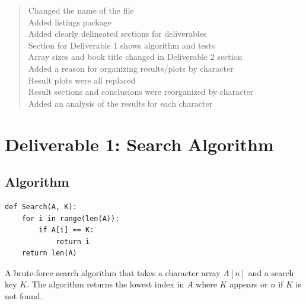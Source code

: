 \documentclass{article}
\begin{document}
\begin{quote}
Changed the name of the file\\
Added listings package \\
Added clearly delineated sections for deliverables \\
Section for Deliverable 1 shows algorithm and tests \\
Array sizes and book title changed in Deliverable 2 section \\
Added a reason for organizing results/plots by character \\
Result plots were all replaced \\
Result sections and conclusions were reorganized by character \\
Added an analysis of the results for each character
\end{quote}

\section{Deliverable 1: Search Algorithm}
\subsection{Algorithm}
\lstset{language=Python}
\begin{lstlisting}
def Search(A, K):
    for i in range(len(A)):
        if A[i] == K:
            return i
    return len(A)
\end{lstlisting}
A brute-force search algorithm that takes a character array \( A[n] \) and a search key \( K \). The algorithm returns the lowest index in \( A \) where \( K \) appears or \( n \) if \( K \) is not found.
\end{document}
